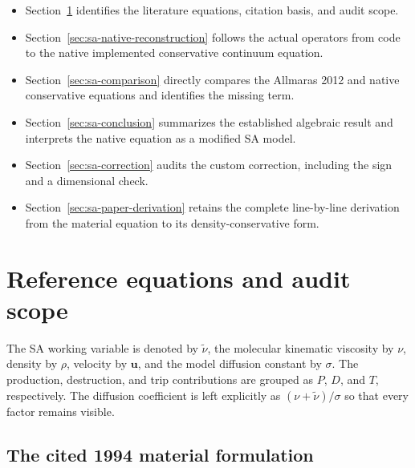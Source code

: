 \begin{itemize}
  \item Section~\ref{sec:sa-reference} identifies the literature equations,
    citation basis, and audit scope.
  \item Section~\ref{sec:sa-native-reconstruction} follows the actual
    \SAOF{} operators from code to the native \SAOF implemented conservative continuum equation.
  \item Section~\ref{sec:sa-comparison} directly compares the Allmaras 2012
    and native \SAOF{} conservative equations and identifies the missing term.
  \item Section~\ref{sec:sa-conclusion} summarizes the established algebraic
    result and interprets the native equation as a modified SA model.
  \item Section~\ref{sec:sa-correction} audits the custom correction,
    including the  sign and a dimensional check.
  \item Section~\ref{sec:sa-paper-derivation} retains the complete
    line-by-line derivation from the material equation to its
    density-conservative form.
\end{itemize}

\section{Reference equations and audit scope}
\label{sec:sa-reference}

The SA working variable is denoted by \(\widetilde{\nu}\), the molecular
kinematic viscosity by \(\nu\), density by \(\rho\), velocity by
\(\boldsymbol u\), and the model diffusion constant by \(\sigma\).  The
production, destruction, and trip contributions are grouped as \(P\), \(D\),
and \(T\), respectively.  The diffusion coefficient is left explicitly as
\((\nu+\widetilde{\nu})/\sigma\) so that every factor remains visible.

\subsection{The cited 1994 material formulation}

